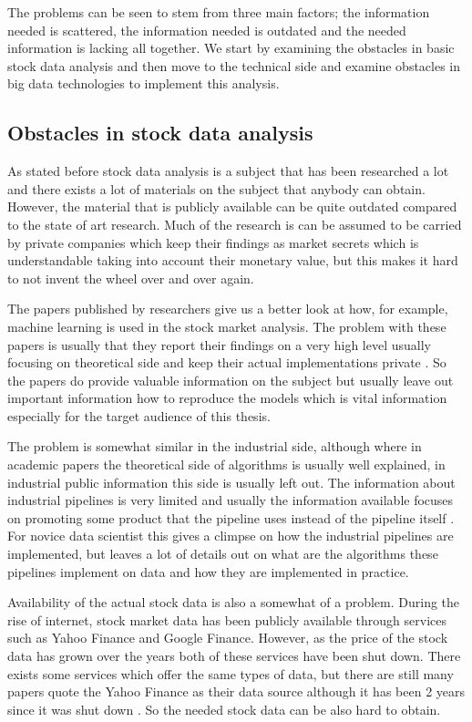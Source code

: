 The problems can be seen to stem from three main factors; the information needed is scattered, the information needed is outdated and the needed information is lacking all together.
We start by examining the obstacles in basic stock data analysis and then move to the technical side and examine obstacles in big data technologies to implement this analysis.

\subsection{Obstacles in stock data analysis}

As stated before stock data analysis is a subject that has been researched a lot and there exists a lot of materials on the subject that anybody can obtain.
However, the material that is publicly available can be quite outdated compared to the state of art research.
Much of the research is can be assumed to be carried by private companies which keep their findings as market secrets which is understandable taking into account their monetary value, but this makes it hard to not invent the wheel over and over again.

The papers published by researchers give us a better look at how, for example, machine learning is used in the stock market analysis.
The problem with these papers is usually that they report their findings on a very high level usually focusing on theoretical side and keep their actual implementations private \cite{le} \cite{adresic} \cite{islam}.
So the papers do provide valuable information on the subject but usually leave out important information how to reproduce the models which is vital information especially for the target audience of this thesis.

The problem is somewhat similar in the industrial side, although where in academic papers the theoretical side of algorithms is usually well explained, in industrial public information this side is usually left out.
The information about industrial pipelines is very limited and usually the information available focuses on promoting some product that the pipeline uses instead of the pipeline itself \cite{palmer} \cite{snively}.
For novice data scientist this gives a climpse on how the industrial pipelines are implemented, but leaves a lot of details out on what are the algorithms these pipelines implement on data and how they are implemented in practice.

Availability of the actual stock data is also a somewhat of a problem.
During the rise of internet, stock market data has been publicly available through services such as Yahoo Finance and Google Finance.
However, as the price of the stock data has grown over the years both of these services have been shut down. \cite{lotter}
There exists some services which offer the same types of data, but there are still many papers quote the Yahoo Finance as their data source although it has been 2 years since it was shut down \cite{serez2} \cite{le}.
So the needed stock data can be also hard to obtain.

